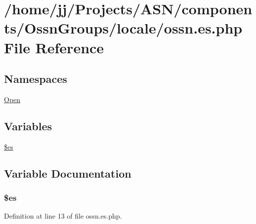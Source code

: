 \hypertarget{components_2_ossn_groups_2locale_2ossn_8es_8php}{}\section{/home/jj/\+Projects/\+A\+S\+N/components/\+Ossn\+Groups/locale/ossn.es.\+php File Reference}
\label{components_2_ossn_groups_2locale_2ossn_8es_8php}
\subsection*{Namespaces}
\begin{DoxyCompactItemize}
\item 
 \hyperlink{namespace_open}{Open}
\end{DoxyCompactItemize}
\subsection*{Variables}
\begin{DoxyCompactItemize}
\item 
\hyperlink{components_2_ossn_groups_2locale_2ossn_8es_8php_a388cbda27103d2baee3997798d1f2744}{\$es}
\end{DoxyCompactItemize}


\subsection{Variable Documentation}
\subsubsection[{\texorpdfstring{\$es}{$es}}]{\setlength{\rightskip}{0pt plus 5cm}\$es}\hypertarget{components_2_ossn_groups_2locale_2ossn_8es_8php_a388cbda27103d2baee3997798d1f2744}{}\label{components_2_ossn_groups_2locale_2ossn_8es_8php_a388cbda27103d2baee3997798d1f2744}


Definition at line 13 of file ossn.\+es.\+php.

